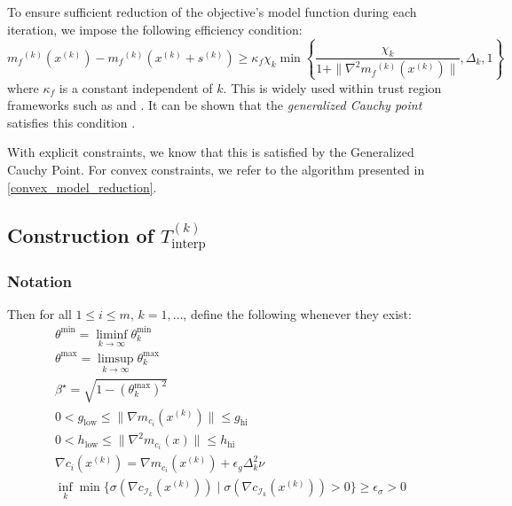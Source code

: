 \documentclass{article}
\theoremstyle{case}
\newcommand{\xk}{{x^{(k)}}}
\newcommand{\dk}{\Delta_k}
\newcommand{\mfk}{{{m}_f}^{(k)}}
\newcommand{\sk}{{{s}^{(k)}}}
\newcommand{\sampletrk}{{T_{\text{interp}}^{(k)}}}
\newcommand{\bs}{{\beta^{\star}}}
\newcommand{\gmcik}{{\nabla m_{c_i}(\xk)}}
\begin{document}
To ensure sufficient reduction of the objective's model function during each iteration, we impose the following efficiency condition:
\begin{equation}
\label{efficiency}
\mfk(\xk) - \mfk(\xk + \sk) \ge \kappa_f \chi_k \min\left\{ \frac{\chi_k}{1+\|\nabla^2 \mfk(\xk)\|}, \dk, 1 \right\}
\end{equation}
where $\kappa_f$ is a constant independent of $k$.
This is widely used within trust region frameworks such as \cite{Conejo:2013:GCT:2620806.2621814} and \cite{Conn:2000:TM:357813}.
It can be shown that the \emph{generalized Cauchy point} satisfies this condition \cite{Conn:2000:TM:357813}.



With explicit constraints, we know that this is satisfied by the Generalized Cauchy Point.
For convex constraints, we refer to the algorithm presented in \cref{convex_model_reduction}.


\subsection{Construction of $\sampletrk$}
\label{feasible_ellipsoid_analysis}

\subsubsection{Notation}
Then for all $1 \le i \le m$, $k = 1, \ldots$, define the following whenever they exist:
\begin{align}
\theta^{\text{min}} = \liminf_{k\to\infty} \theta^{\text{min}}_k \label{def_theta_min} \\
\theta^{\text{max}} = \limsup_{k\to\infty} \theta^{\text{max}}_k \label{def_theta_max} \\
\bs = \sqrt{ 1 - (\theta^{\text{max}}_k)^2} \label{def_bs} \\
0 < g_{\text{low}} \le \|\gmcik\| \le g_{\text{hi}} \label{def_g_bounds} \\
0 < h_{\text{low}} \le \|\nabla^2m_{c_i}(x)\| \le h_{\text{hi}} \label{def_h_bounds} \\
\nabla c_i(\xk) = \nabla m_{c_i}(\xk) + \epsilon_{g}\dk^2\nu \label{def_lambda_poised} \\
\inf_{k}\min\{\sigma(\nabla c_{\mathcal I_k}(\xk)) \; | \; \sigma(\nabla c_{\mathcal I_k}(\xk)) > 0 \} \ge \epsilon_{\sigma} > 0\\
\end{align}
\end{document}

